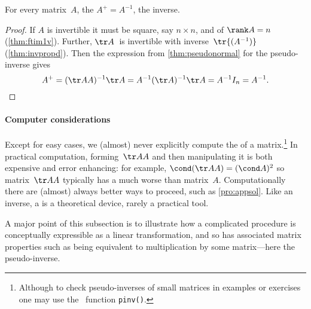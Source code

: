 \begin{theorem} \label{thm:pinvinv}
For every  matrix~\(A\), the  \(A^+=A^{-1}\), the inverse.
\end{theorem}
\begin{proof} 
If \(A\) is invertible it must be square, say \(n\times n\), and of \(\rank A=n\) (\cref{thm:ftim1v}).
Further, \(\tr A\)~is invertible with inverse~\(\tr{(A^{-1})}\) (\cref{thm:invpropd}).
Then the expression from \cref{thm:pseudonormal} for the pseudo-inverse gives
\begin{equation*}
A^+=(\tr AA)^{-1}\tr A
=A^{-1}(\tr A)^{-1}\tr A
=A^{-1}I_n=A^{-1}.
\end{equation*}
\end{proof}




\paragraph{Computer considerations} 
Except for easy cases, we (almost) never explicitly compute the  of a matrix.\footnote{Although to check pseudo-inverses of small matrices in examples or exercises one may use the \script\ function \texttt{pinv()}.}
In practical computation, forming~\(\tr AA\) and then manipulating it is both expensive and error enhancing: for example, \(\cond(\tr AA)=(\cond A)^2\) so matrix~\(\tr AA\) typically has a much worse  than matrix~\(A\).
Computationally there are (almost) always better ways to proceed, such as \cref{pro:appsol}.
Like an inverse, a  is a theoretical device, rarely a practical tool.

A major point of this subsection is to illustrate how a complicated procedure is conceptually expressible as a linear transformation, and so has associated matrix properties such as being equivalent to multiplication by some matrix---here the pseudo-inverse.







\begin{comment}
connect to normal equation?  Possibly establish the Penrose conditions, \(AA^+A=A\), \(A^+AA^+=A^+\), and \(AA^+\) and \(A^+A\) are symmetric, but as yet I do not see any need.
\end{comment}







